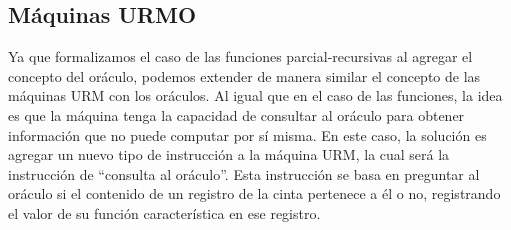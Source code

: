 \begin{agregado}
\subsection{Máquinas URMO}

Ya que formalizamos el caso de las funciones parcial-recursivas al agregar el concepto del oráculo, podemos extender de manera similar el concepto de las máquinas URM con los oráculos. Al igual que en el caso de las funciones, la idea es que la máquina tenga la capacidad de consultar al oráculo para obtener información que no puede computar por sí misma. En este caso, la solución es agregar un nuevo tipo de instrucción a la máquina URM, la cual será la instrucción de ``consulta al oráculo''. Esta instrucción se basa en preguntar al oráculo si el contenido de un registro de la cinta pertenece a él o no, registrando el valor de su función característica en ese registro.


\end{agregado}
